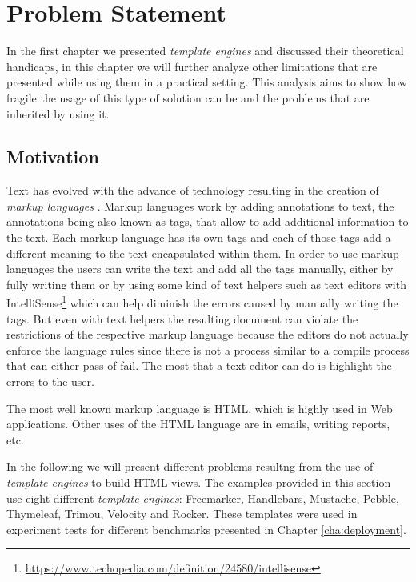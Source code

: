 \chapter{Problem Statement}
\label{cha:problem}

\sloppy

In the first chapter we presented \textit{template engines} and discussed their theoretical handicaps, in this chapter we will further analyze other limitations that are presented while using them in a practical setting. This analysis aims to show how fragile the usage of this type of solution can be and the problems that are inherited by using it.

\section{Motivation}
\label{sec:motivation}

Text has evolved with the advance of technology resulting in the creation of \textit{markup languages} \cite{markuplanguages}. Markup languages work by adding annotations to text, the annotations being also known as tags, that allow to add additional information to the text. Each markup language has its own tags and each of those tags add a different meaning to the text encapsulated within them. In order to use markup languages the users can write the text and add all the tags manually, either by fully writing them or by using some kind of text helpers such as text editors with IntelliSense\footnote{\url{https://www.techopedia.com/definition/24580/intellisense}} which can help diminish the errors caused by manually writing the tags. But even with text helpers the resulting document can violate the restrictions of the respective markup language because the editors do not actually enforce the language rules since there is not a process similar to a compile process that can either pass of fail. The most that a text editor can do is highlight the errors to the user.

\noindent
The most well known markup language is \ac{HTML}, which is highly used in Web applications. Other uses of the \ac{HTML} language are in emails, writing reports, etc.

\noindent
In the following we will present different problems resultng from the use of \textit{template engines} to build \ac{HTML} views. The examples provided in this section use eight different \textit{template engines}: Freemarker\cite{freemarker}, Handlebars\cite{handlebars}, Mustache\cite{mustache}, Pebble\cite{pebble}, Thymeleaf\cite{thymeleaf}, Trimou\cite{trimou}, Velocity\cite{velocity} and Rocker\cite{rocker}. These templates were used in experiment tests for different benchmarks presented in Chapter \ref{cha:deployment}.


